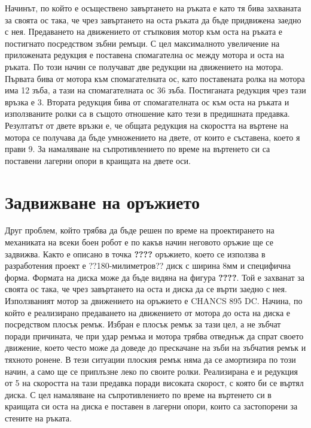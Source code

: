 Начинът, по който е осъществено завъртането на ръката е като тя бива захваната за своята ос така, че чрез завъртането на оста ръката да бъде придвижена заедно с нея. Предаването на движението от стъпковия мотор към оста на ръката е постигнато посредством зъбни ремъци. С цел максималното увеличение на приложената редукция е поставена спомагателна ос между мотора и оста на ръката. По този начин се получават две редукции на движението на мотора. Първата бива от мотора към спомагателната ос, като поставената ролка на мотора има 12 зъба, а тази на спомагателната ос 36 зъба. Постиганата редукция чрез тази връзка е 3. Втората редукция бива от спомагателната ос към оста на ръката и използваните ролки са в същото отношение като тези в предишната предавка. Резултатът от двете връзки е, че общата редукция на скоростта на въртене на мотора се получава да бъде умножението на двете, от които е съставена, което я прави 9. За намаляване на съпротивлението по време на въртенето си са поставени лагерни опори в краищата на двете оси.



\section{Задвижване на оръжието}

Друг проблем, който трябва да бъде решен по време на проектирането на механиката на всеки боен робот е по какъв начин неговото оръжие ще се задвижва. Както е описано в точка \textbf{????} оръжието, което се използва в разработения проект е ??180-милиметров?? диск с ширина 8мм и специфична форма. Формата на диска може да бъде видяна на фигура \textbf{????}. Той е захванат за своята ос така, че чрез завъртането на оста и диска да се върти заедно с нея. Използваният мотор за движението на оръжието е CHANCS 895 DC. Начина, по който е реализирано предаването на движението от мотора до оста на диска е посредством плосък ремък. Избран е плосък ремък за тази цел, а не зъбчат поради причината, че при удар ремъка и мотора трябва отведнъж да спрат своето движение, което често може да доведе до прескачане на зъби на зъбчатия ремък и тяхното ронене. В тези ситуации плоския ремък няма да се амортизира по този начин, а само ще се приплъзне леко по своите ролки. Реализирана е и редукция от 5 на скоростта на тази предавка поради високата скорост, с която би се въртял диска. С цел намаляване на съпротивлението по време на въртенето си в краищата си оста на диска е поставен в лагерни опори, които са застопорени за стените на ръката.


